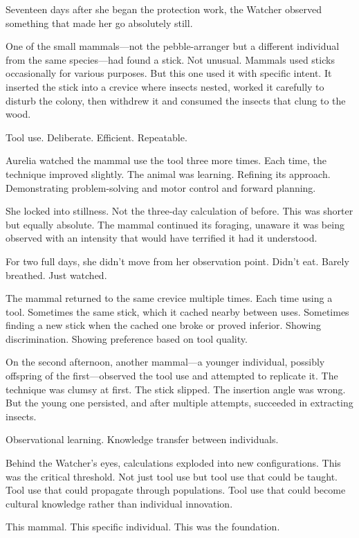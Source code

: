 \scenebreak

Seventeen days after she began the protection work, the Watcher observed something that made her go absolutely still.

One of the small mammals—not the pebble-arranger but a different individual from the same species—had found a stick. Not unusual. Mammals used sticks occasionally for various purposes. But this one used it with specific intent. It inserted the stick into a crevice where insects nested, worked it carefully to disturb the colony, then withdrew it and consumed the insects that clung to the wood.

Tool use. Deliberate. Efficient. Repeatable.

Aurelia watched the mammal use the tool three more times. Each time, the technique improved slightly. The animal was learning. Refining its approach. Demonstrating problem-solving and motor control and forward planning.

She locked into stillness. Not the three-day calculation of before. This was shorter but equally absolute. The mammal continued its foraging, unaware it was being observed with an intensity that would have terrified it had it understood.

For two full days, she didn't move from her observation point. Didn't eat. Barely breathed. Just watched.

The mammal returned to the same crevice multiple times. Each time using a tool. Sometimes the same stick, which it cached nearby between uses. Sometimes finding a new stick when the cached one broke or proved inferior. Showing discrimination. Showing preference based on tool quality.

On the second afternoon, another mammal—a younger individual, possibly offspring of the first—observed the tool use and attempted to replicate it. The technique was clumsy at first. The stick slipped. The insertion angle was wrong. But the young one persisted, and after multiple attempts, succeeded in extracting insects.

Observational learning. Knowledge transfer between individuals.

Behind the Watcher's eyes, calculations exploded into new configurations. This was the critical threshold. Not just tool use but tool use that could be taught. Tool use that could propagate through populations. Tool use that could become cultural knowledge rather than individual innovation.

This mammal. This specific individual. This was the foundation.

